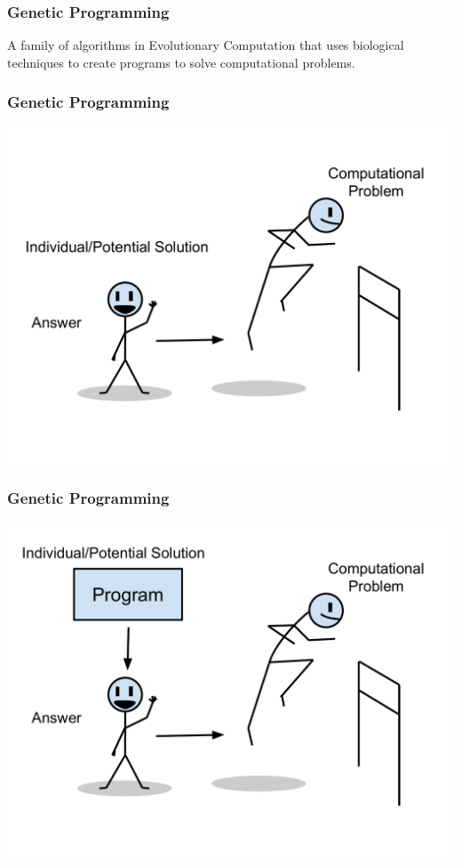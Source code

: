 \documentclass{beamer}
\begin{document}
\begin{frame}
	\frametitle{Genetic Programming}
	A family of algorithms in Evolutionary Computation that uses biological techniques to create programs to solve computational problems.
\end{frame}

\begin{frame}
	\frametitle{Genetic Programming}
	\includegraphics[height=.9\textheight]{Illustrations/gp_1.PDF}
\end{frame}
\begin{frame}
	\frametitle{Genetic Programming}
	\includegraphics[height=.9\textheight]{Illustrations/gp_2.PDF}
\end{frame}
\end{document}
